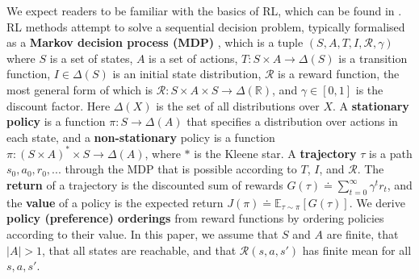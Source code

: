 \documentclass{article}
\theoremstyle{definition}
\theoremstyle{remark}
\begin{document}
We expect readers to be familiar with the basics of RL, which can be found in \citet{sutton2018reinforcement}.
RL methods attempt to solve a sequential decision problem, typically formalised as a \textbf{Markov decision process (MDP)} , which is a tuple $(S,A,T,I,\mathcal{R},\gamma)$ where $S$ is a set of states, $A$ is a set of actions, $T : S \times A \rightarrow \Delta(S)$ is a transition function, $I \in \Delta(S)$ is an initial state distribution, $\mathcal{R}$ is a reward function, the most general form of which is $\mathcal{R} : S \times A \times S \rightarrow \Delta(\mathbb{R})$, and $\gamma \in [0,1]$ is the discount factor.
Here $\Delta(X)$ is the set of all distributions over $X$. 
A \textbf{stationary policy} is a function $\pi : S \rightarrow \Delta(A)$ that specifies a distribution over actions in each state, and a \textbf{non-stationary} policy is a function $\pi : (S \times A)^* \times S \rightarrow \Delta(A)$, where $*$ is the Kleene star.
A \textbf{trajectory} $\tau$ is a path $s_0,a_0,r_0,...$ through the MDP that is possible according to $T$, $I$, and $\mathcal{R}$. 
The \textbf{return} of a trajectory is the discounted sum of rewards $G(\tau) \doteq \sum_{t=0}^\infty \gamma^t r_t$, and the \textbf{value} of a policy is the expected return $J(\pi) \doteq \mathbb{E}_{\tau \sim \pi}[G(\tau)]$. 
We derive \textbf{policy (preference) orderings} from reward functions by ordering policies according to their value.
In this paper, we assume that $S$ and $A$ are finite, that $|A| > 1$, that all states are reachable, and that $\mathcal{R}(s,a,s')$ has finite mean for all $s,a,s'$. 
\end{document}
